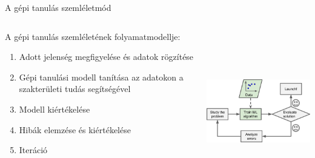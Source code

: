 \documentclass[english, aspectratio=169]{beamer}
\begin{document}
\begin{frame}{A gépi tanulás szemléletmód}
\begin{columns}
\begin{column}{.5\textwidth}
A gépi tanulás szemléletének folyamatmodellje:
\begin{enumerate}
	\item Adott jelenség megfigyelése és adatok rögzítése
	\item Gépi tanulási modell tanítása az adatokon a szakterületi tudás segítségével
	\item Modell kiértékelése
	\item Hibák elemzése és kiértékelése
	\item Iteráció
\end{enumerate}
\end{column}
\begin{column}{.5\textwidth}
\begin{center}
\includegraphics[width=7cm, height=7cm, keepaspectratio]{images/osztalyozas_2.png}
\end{center}
\end{column}
\end{columns}
\end{frame}
\end{document}

